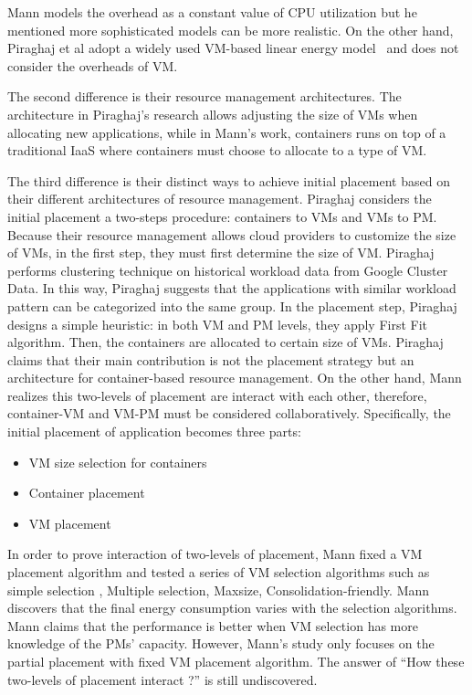  Mann models the overhead as a constant value of CPU utilization but he mentioned more sophisticated models can be more realistic. On the other hand, Piraghaj et al \cite{Piraghaj:2016bw} adopt a widely used VM-based linear energy model~\cite{Xavier:2017jl} and does not consider the overheads of VM. 

The second difference is their resource management architectures. The architecture in Piraghaj's research allows adjusting 
the size of VMs when allocating new applications, while in Mann's work, containers runs on top of a traditional IaaS where containers must choose to allocate to a type of VM. 

The third difference is their distinct ways to achieve initial placement based on their different architectures of resource management. Piraghaj considers the initial placement a two-steps procedure: containers to VMs and VMs to PM. Because their resource management allows cloud providers to customize the size of VMs, in the first step, they must first determine the size of VM. Piraghaj performs clustering technique on historical workload data from Google Cluster Data. In this way, Piraghaj suggests that the applications with similar workload pattern can be categorized into the same group. In the placement step, Piraghaj designs a simple heuristic: in both VM and PM levels, they apply First Fit algorithm. Then, the containers are allocated to certain size of VMs. Piraghaj claims that their main contribution is not the placement strategy but an architecture for container-based resource management. On the other hand, Mann realizes this two-levels of placement are interact with each other, therefore, container-VM and VM-PM must be considered collaboratively. Specifically, the initial placement of application becomes three parts: 

\begin{itemize}
	\item VM size selection for containers
	\item Container placement
	\item VM placement
\end{itemize}

In order to prove interaction of two-levels of placement, Mann fixed a VM placement algorithm and tested a series of VM selection algorithms such as simple selection \cite{Ganesan:2012eb},  Multiple selection, Maxsize, Consolidation-friendly. Mann discovers that the final energy consumption varies with the selection algorithms. Mann claims that the performance is better when VM selection has more knowledge of the PMs' capacity. However, Mann's study only focuses on the partial placement with fixed VM placement algorithm. The answer of ``How these two-levels of placement interact ?'' is still undiscovered.


